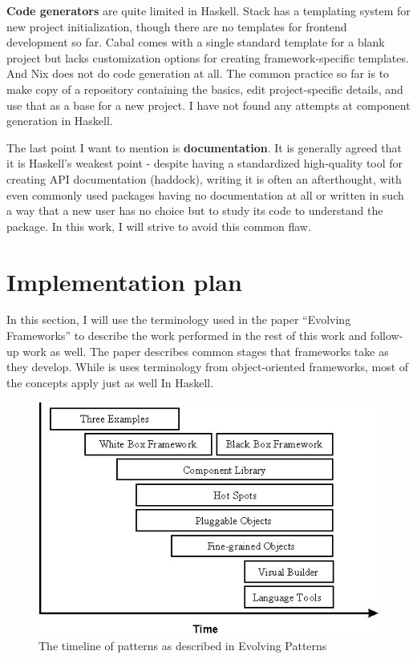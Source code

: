 \documentclass[english,odsaz]{fitthesis}
\begin{document}
\textbf{Code generators} are quite limited in Haskell. Stack has a templating system for
new project initialization, though there are no templates for frontend
development so far. Cabal comes with a single standard template for a blank
project but lacks customization options for creating framework-specific
templates. And Nix does not do code generation at all. The common practice so
far is to make copy of a repository containing the basics, edit project-specific
details, and use that as a base for a new project. I have not found any attempts
at component generation in Haskell.

The last point I want to mention is \textbf{documentation}. It is generally agreed that
it is Haskell's weakest point - despite having a standardized
high-quality tool for creating API documentation (haddock), writing it is often an
afterthought, with even commonly used packages having no documentation at all or
written in such a way that a new user has no choice but to study its code to
understand the package. In this work, I will strive to avoid this common flaw.

\section{Implementation plan}
\label{sec:orgb6938be}
In this section, I will use the terminology used in the paper ``Evolving Frameworks''
\cite{roberts1996evolving} to describe the work performed in the rest of this work
and follow-up work as well. The paper describes common stages that frameworks
take as they develop. While is uses terminology from object-oriented frameworks,
most of the concepts apply just as well In Haskell.

\begin{figure}[htbp]
\centering
\includegraphics[width=.9\linewidth]{./obrazky-figures/evolving-frameworks.jpg}
\caption{The timeline of patterns as described in Evolving Patterns}
\end{figure}
\end{document}
